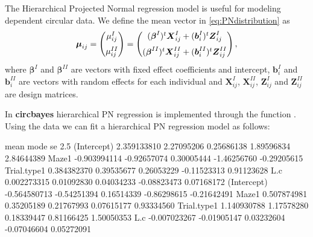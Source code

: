 \documentclass{article}
\newcommand{\code}[1]{\texttt{\detokenize{#1}}}
\newcommand{\pkg}[1]{\textbf{#1}}
\newenvironment{CodeChunk}{}{}
\begin{document}
		The Hierarchical Projected Normal regression model
		\citep{nunez2014bayesian} is useful for modeling dependent circular
		data. We define the mean vector in \eqref{eq:PNdistribution} as
		\begin{equation}
		\boldsymbol{\mu}_{ij} = \begin{pmatrix}
		\mu_{ij}^{I}  \vspace{0.2cm}  \\
		\mu_{ij}^{II}
		\end{pmatrix}=\begin{pmatrix}
		(\boldsymbol{\beta}^{I})^{t}\boldsymbol{X}_{ij}^{I} + (\boldsymbol{b}_i^{I})^t\boldsymbol{Z}_{ij}^{I} \vspace{0.2cm}  \\
		(\boldsymbol{\beta}^{II})^{t}\boldsymbol{X}_{ij}^{II} + (\boldsymbol{b}_i^{II})^t\boldsymbol{Z}_{ij}^{II}
		\end{pmatrix},
		\end{equation} where \(\boldsymbol{\beta}^{I}\) and
		\(\boldsymbol{\beta}^{II}\) are vectors with fixed effect coefficients
		and intercept, \(\boldsymbol{b}_{i}^{I}\) and
		\(\boldsymbol{b}_{i}^{II}\) are vectors with random effects for each
		individual and \(\boldsymbol{X}_{ij}^{I}\),
		\(\boldsymbol{X}_{ij}^{II}\), \(\boldsymbol{Z}_{ij}^{I}\) and
		\(\boldsymbol{Z}_{ij}^{II}\) are design matrices.
		
		In \pkg{circbayes} hierarchical PN regression is implemented through the
		function \code{pn_me_reg()}. Using the \code{Maps} data
		\citep{Warren2017} we can fit a hierarchical PN regression model as
		follows:
		
		\begin{CodeChunk}
		
	
	\begin{CodeOutput}
		mean        mode         se        2.5%
		(Intercept)  2.359133810  2.27095206 0.25686138  1.89596834  2.84644389
		Maze1       -0.903994114 -0.92657074 0.30005444 -1.46256760 -0.29205615
		Trial.type1  0.384382370  0.39535677 0.26053229 -0.11523313  0.91123628
		L.c          0.002273315  0.01092830 0.04034233 -0.08823473  0.07168172
		(Intercept) -0.564580713 -0.54251394 0.16514339 -0.86298615 -0.21642491
		Maze1        0.507874981  0.35205189 0.21767993  0.07615177  0.93334560
		Trial.type1  1.140930788  1.17578280 0.18339447  0.81166425  1.50050353
		L.c         -0.007023267 -0.01905147 0.03232604 -0.07046604  0.05272091
	\end{CodeOutput}
\end{CodeChunk}
\end{document}
